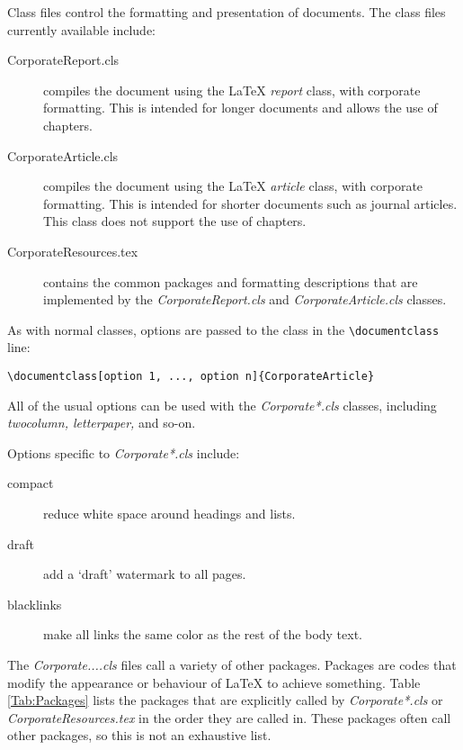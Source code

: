 Class files control the formatting and presentation of documents. The class files currently available include:
\begin{description}
\item[CorporateReport.cls]{compiles the document using the LaTeX \emph{report} class, with corporate formatting. This is intended for longer documents and allows the use of chapters.}
\item[CorporateArticle.cls] compiles the document using the LaTeX \emph{article} class, with corporate formatting. This is intended for shorter documents such as journal articles. This class does not support the use of chapters.
\item[CorporateResources.tex] contains the common packages and formatting descriptions that are implemented by the \emph{CorporateReport.cls} and \emph{CorporateArticle.cls} classes.
\end{description}

As with normal classes, options are passed to the class in the \verb+\documentclass+ line:

\begin{lstlisting}
\documentclass[option 1, ..., option n]{CorporateArticle}
\end{lstlisting}

All of the usual options can be used with the \emph{Corporate*.cls} classes, including \emph{twocolumn, letterpaper,} and so-on.

Options specific to \emph{Corporate*.cls} include:
\begin{description}
\item[compact]{reduce white space around headings and lists.}
\item[draft]{add a `draft' watermark to all pages.}
\item[blacklinks]{make all links the same color as the rest of the body text.}
\end{description}

The \emph{Corporate....cls} files call a variety of other packages. Packages are codes that modify the appearance or behaviour of LaTeX to achieve something. Table \ref{Tab:Packages} lists the packages that are explicitly called by \emph{Corporate*.cls} or \emph{CorporateResources.tex} in the order they are called in. These packages often call other packages, so this is not an exhaustive list.

